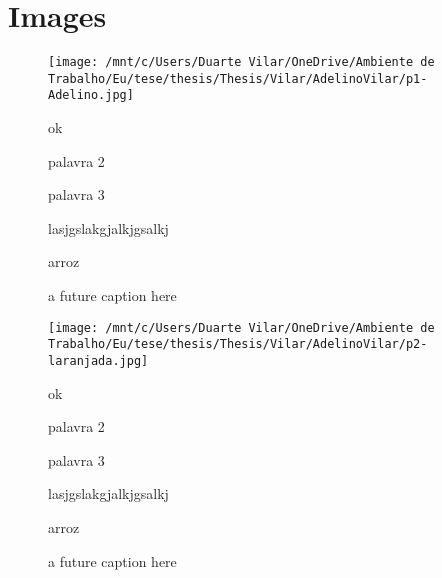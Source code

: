 \documentclass{article}
\begin{document}
\clearpage
\section{Images}




    \begin{figure}[ht!]
        \begin{minipage}{0.35\textwidth}
            \centering
            \texttt{[image: /mnt/c/Users/Duarte Vilar/OneDrive/Ambiente de Trabalho/Eu/tese/thesis/Thesis/Vilar/AdelinoVilar/p1-Adelino.jpg]}
            \caption{a future caption here}
        \end{minipage}
        \hspace{1cm} %
        \begin{minipage}{0.3\textwidth}
            ok

            palavra 2

            palavra 3

            lasjgslakgjalkjgsalkj

            arroz
            
        \end{minipage}
    \end{figure}



    \begin{figure}[ht!]
        \begin{minipage}{0.35\textwidth}
            \centering
            \texttt{[image: /mnt/c/Users/Duarte Vilar/OneDrive/Ambiente de Trabalho/Eu/tese/thesis/Thesis/Vilar/AdelinoVilar/p2-laranjada.jpg]}
            \caption{a future caption here}
        \end{minipage}
        \hspace{1cm} %
        \begin{minipage}{0.3\textwidth}
            ok

            palavra 2

            palavra 3

            lasjgslakgjalkjgsalkj

            arroz
            
        \end{minipage}
    \end{figure}
\end{document}

